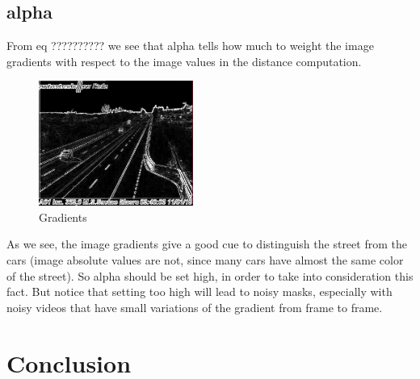 \subsection*{alpha}
From eq ?????????? we see that alpha tells how much to weight the image gradients
with respect to the image values in the distance computation.
\begin{figure}[!t]
    \centering
    \includegraphics[width=0.45\textwidth]{Figures/gradients.jpg}
    \caption{Gradients}
    \label{fig:gradients}
\end{figure}
As we see, the image gradients give a good cue to distinguish the street from the cars
(image absolute values are not, since many cars have almost the same color of the
street). So alpha should be set high, in order to take into consideration this fact.
But notice that setting too high will lead to noisy masks, especially with noisy
videos that have small variations of the gradient from frame to frame.
\begin{figure}[!t]
    \centering
\end{figure}




\section*{Conclusion}


